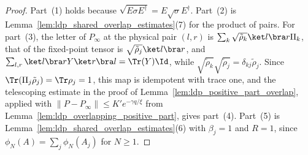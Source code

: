 \begin{proof}
    \leanok
    Part~(1) holds because $\sqrt{E\sigma E^\dagger}=E\sqrt\sigma E^\dagger$. Part~(2) is
    Lemma~\ref{lem:ldp_shared_overlap_estimates}(7) for the product of pairs. For
    part~(3), the letter of $P_\infty$ at the physical pair $(l,r)$ is
    $\sum_k\sqrt{\tilde\rho_k}\ket l\bra r\Pi_k$, that of the fixed-point tensor is
    $\sqrt{\tilde\rho_j}\ket l\bra r$, and
    $\sum_{l,r}\ket l\bra rY\ket r\bra l=\Tr(Y)\Id$, while
    $\sqrt{\tilde\rho_k}\sqrt{\tilde\rho_j}=\delta_{kj}\tilde\rho_j$. Since
    $\Tr(\Pi_j\tilde\rho_j)=\Tr\rho_j=1$, this map is idempotent with trace one, and
    the telescoping estimate in the proof of
    Lemma~\ref{lem:ldp_positive_part_overlap}, applied with
    $\lVert P-P_\infty\rVert\leq K'e^{-\gamma q/\xi}$ from
    Lemma~\ref{lem:ldp_overlapping_positive_part}, gives part~(4). Part~(5) is
    Lemma~\ref{lem:ldp_shared_overlap_estimates}(6) with $\beta_j=1$ and $R=1$, since
    $\phi_N(A)=\sum_j\phi_N(A_j)$ for $N\geq1$.
\end{proof}

